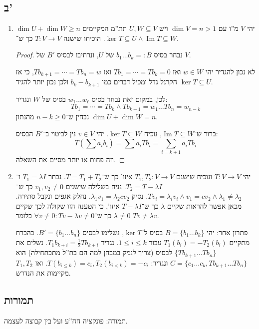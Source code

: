 \documentclass[]{article}
\newcommand\ml    {\ell}
\DeclareMathOperator\Img   {Im}
\newcommand\co        {\colon}
\renewcommand\lg      {\lambda}
\newcommand\cl [1]    {\left ( #1 \right )}
\theoremstyle{definition}
\begin{document}
	\subsection*{ב'}
	\begin{enumerate}
		\item יהי $V$ מ''ו עם $\dim V = n > 1$ ויש $U, W \subseteq V$ תת''מ המקיימים $\dim U + \dim W \ge n$. הוכיחו שישנה $T \co V \to V$ כך ש־$\ker T \subseteq U \land \Img T \subseteq W$. 
		\begin{proof}
			נבחר בסיס $b_1 \dots b_k =: B$ של $U$, ונרחיבו לבסיס $B'$ של $V$. 
			
			לא נכון להגדיר יהי $w \in W$ ואז $Tb_1 = \cdots = Tb_k = 0$ ואז $Tb_{k + 1} = \cdots = Tb_n = w$, כי אז הקרנל גדל ומכיל דברים כמו $b_k - b_{k + 1}$ ולכן נכון יותר להגיד $\ker T \subseteq U$. 
			
			לכן, במקום זאת נבחר בסיס $w_1 \dots w_\ml$ בסיס של $W$ ונגדיר: 
			\[ Tb_1 = \cdots = Tb_k \land Tb_{k + 1} = w_1\dots Tb_n = w_{n - k} \]
			נבחין ש־$n -k \ge 0$ מהנתון $\dim U + \dim W = n$. 
			
			ברור ש־$\Img T \subseteq W$, נוכיח $\ker T \subseteq W$. יהי $v \in V$ נין לביטוי ב־$B'$ הבסיס: 
			\[ T\cl{\sum a_i b_i} = \sum a_i Tb_i = \sum_{i = k + 1}a_i Tb_i \]
			וזה פחות או יותר מסיים את השאלה. 
		\end{proof}
		
		\item יהי $T \co V \to V$ ונוכיח שישנם $T_1, T_2 \co V \to V$ איזו' כך ש־$T = T_1 + T_2$. נבחר $T_1 = \lg I$ ו־$T_2 = T - \lg I$. נניח בשלילה שישנים $v_1, v_2 \neq 0$ כך ש־$Tv_i = \lg_i v_i \land v_1 = cv_2 \land \lg_1 \neq \lg_2$. נסיק $\lg_1 v_1 = \lg_2 cv_2$. נחלק אגפים ונקבל סתירה. מכאן אפשר להראות שקיים $\lg$ כך ש־$T - \lg I$ איזו', כי הטענה הזו שקולה לכך שקיים $\lg \neq 0$ כך ש־$\forall v \neq 0 \co Tv - \lg v\neq 0$ כלומר $Tv \neq \lg v$. 
		
		פתרון אחר: יהי $B = \{b_1 \dots b_k\}$ בסיס ל־$\ker T$, נשלימו לבסיס $B' = \{b_1 \dots b_n\}$. בהכרח מתקיים $T_1(b_i) = - T_2(b_i)$ עבור $1 \le i \le k$. נגדיר $T_1b_{k + i} = \frac{1}{2}Tb_{k + i}$. נשלים את $\{Tb_{k + 1} \dots Tb_{n}\}$ לבסיס (צריך לנמק במבחן למה הם בת''ל מתכתחילה) הוא $C = \{c_1 \dots c_k, Tb_{k + 1} \dots Tb_n\}$ ונגדיר: $T(b_{i \le k}) = c_i, T_2(b_{i < k}) = -c_i$. ואז $T_1, T_2$ מקיימות את הנדרש. 
	\end{enumerate}
	
	
	\subsection*{תמורות}
	תמורה: פונקציה חח''ע ועל בין קבוצה לעצמה. 
	
\end{document}
